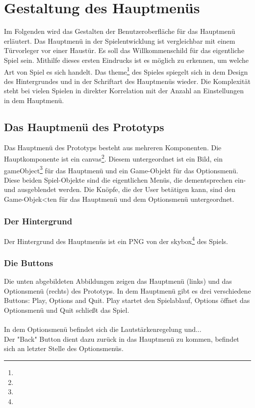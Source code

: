 \section{Gestaltung des Hauptmenüs}

Im Folgenden wird das Gestalten der Benutzeroberfläche für das Hauptmenü erläutert. 
Das Hauptmenü in der Spielentwicklung ist vergleichbar mit einem Türvorleger vor einer Haustür. Es soll das Willkommenschild für das eigentliche Spiel sein. 
Mithilfe dieses ersten Eindrucks ist es möglich zu erkennen, um welche Art von Spiel es sich handelt. Das \gls{theme}\footnote[1]{} des Spieles spiegelt sich in dem Design des Hintergrundes und in der Schriftart des Hauptmenüs wieder. Die Komplexität steht bei vielen Spielen in direkter Korrelation mit der Anzahl an Einstellungen in dem Hauptmenü.

\pagebreak

\subsection{Das Hauptmenü des Prototyps}

Das Hauptmenü des Prototyps besteht aus mehreren Komponenten. Die Hauptkomponente ist ein \gls{canvas}\footnote[1]{}. Diesem untergeordnet ist ein Bild, ein \gls{gameObject}\footnote[2]{} für das Hauptmenü und ein Game-Objekt für das Optionsmenü. Diese beiden Spiel-Objekte sind die eigentlichen Menüs, die dementsprechen ein- und ausgeblendet werden. Die Knöpfe, die der User betätigen kann, sind den Game-Objek<ten für das Hauptmenü und dem Optionsmenü untergeordnet. 

\subsubsection{Der Hintergrund}
Der Hintergrund des Hauptmenüs ist ein PNG von der \gls{skybox}\footnote[3]{} des Spiels. 

\subsubsection{Die Buttons}
Die unten abgebildeten Abbildungen zeigen das Hauptmenü (links) und das Optionsmenü (rechts) des Prototyps. In dem Hauptmenü gibt es drei verschiedene Buttons: Play, Options and Quit. Play startet den Spielablauf, Options öffnet das Optionsmenü und Quit schließt das Spiel.\\\\
In dem Optionsmenü befindet sich die Lautstärkenregelung und... \\
Der "Back" Button dient dazu zurück in das Hauptmenü zu kommen, befindet sich an letzter Stelle des Optionsmenüs.


